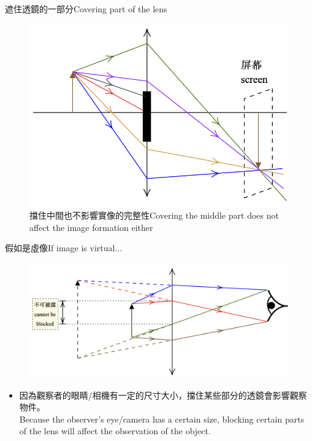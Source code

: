 \documentclass[beamer=true]{standalone}
\begin{document}
\begin{frame}{遮住透鏡的一部分Covering part of the lens}
    \begin{figure}
        \centering
        \includegraphics[width=0.75\linewidth]{assets/x89n9u92382.png}

        \caption{擋住中間也不影響實像的完整性Covering the middle part does not affect the image formation either}

    \end{figure}
\end{frame}

\begin{frame}{假如是虛像If image is virtual...}
    \begin{figure}
        \centering
        \includegraphics[width=1\linewidth]{assets/dun90du298n329.png}
    \end{figure}
    \begin{itemize}
        \item 因為觀察者的眼睛/相機有一定的尺寸大小，擋住某些部分的透鏡會影響觀察物件。\\Because the observer's eye/camera has a certain size, blocking certain parts of the lens will affect the observation of the object.
    \end{itemize}
\end{frame}
\end{document}
